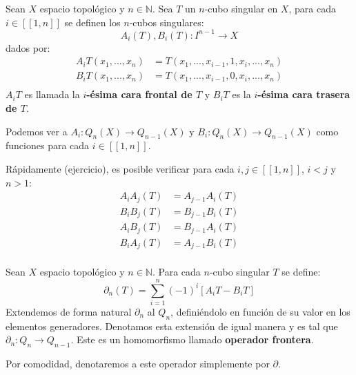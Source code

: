 \documentclass[12pt]{report}
\newcounter{it}
\theoremstyle{largebreak}
\newcommand\cf[3]{\ensuremath{#1:#2\rightarrow#3}}
\newcommand\natint[1]{\ensuremath{\left[\!\left[ #1\right]\!\right]}}
\begin{document}
    \begin{mydef}
        Sean $X$ espacio topológico y $n\in\mathbb{N}$. Sea $T$ un $n$-cubo singular en $X$, para cada $i\in\natint{1,n}$ se definen los $n$-cubos singulares:
        \begin{equation*}
            \cf{A_i(T),B_i(T)}{I^{ n-1}}{X}
        \end{equation*}
        dados por:
        \begin{equation*}
            \begin{split}
                A_iT(x_1,...,x_n)&=T(x_1,...,x_{ i-1},1,x_i,...,x_n)\\
                B_iT(x_1,...,x_n)&=T(x_1,...,x_{ i-1},0,x_i,...,x_n)\\
            \end{split}
        \end{equation*}
        $A_iT$ es llamada la \textbf{$i$-ésima cara frontal de $T$} y $B_iT$ es la \textbf{$i$-ésima cara trasera de $T$}.
    \end{mydef}

    \begin{obs}
        Podemos ver a $\cf{A_i}{Q_n(X)}{Q_{ n-1}(X)}$ y $\cf{B_i}{Q_n(X)}{Q_{ n-1}(X)}$ como funciones para cada $i\in\natint{1,n}$.
    \end{obs}

    Rápidamente (ejercicio), es posible verificar para cada $i,j\in\natint{1,n}$, $i< j$ y $n>1$:
    \begin{equation}
        \label{faceConmutativeIdentities}
        \begin{split}
            A_iA_j(T)&=A_{ j-1}A_i(T)\\
            B_iB_j(T)&=B_{ j-1}B_i(T)\\
            A_iB_j(T)&=B_{ j-1}A_i(T)\\
            B_iA_j(T)&=A_{ j-1}B_i(T)\\
        \end{split}
    \end{equation}

    \newcommand{\bound}[1]{\textup{\partial\left(#1\right)}}

    \begin{mydef}
        Sean $X$ espacio topológico y $n\in\mathbb{N}$. Para cada $n$-cubo singular $T$ se define:
        \begin{equation*}
            \partial_n(T)=\sum_{ i=1}^n (-1)^i\left[A_iT-B_iT \right]
        \end{equation*}
        Extendemos de forma natural $\partial_n$ al $Q_n$, definiéndolo en función de su valor en los elementos generadores. Denotamos esta extensión de igual manera y es tal que $\cf{\partial_n}{Q_n}{Q_{n-1}}$. Este es un homomorfismo llamado \textbf{operador frontera}.

        Por comodidad, denotaremos a este operador simplemente por $\partial$.
    \end{mydef}
\end{document}
